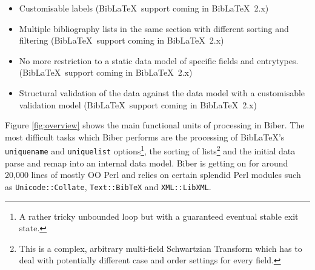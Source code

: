 \documentclass{ltxdockit}
\begin{document}
\begin{itemize}
  etc. (Bib\LaTeX\ support coming in Bib\LaTeX\ 2.x)
\item Customisable labels (Bib\LaTeX\ support coming in
  Bib\LaTeX\ 2.x)
\item Multiple bibliography lists in the same section with different
  sorting and filtering (Bib\LaTeX\ support coming in Bib\LaTeX\ 2.x)
\item No more restriction to a static data model of specific fields and
  entrytypes. (Bib\LaTeX\ support coming in Bib\LaTeX\ 2.x)
\item Structural validation of the data against the data model with a
  customisable validation model (Bib\LaTeX\ support coming in
  Bib\LaTeX\ 2.x)
\end{itemize}

\noindent Figure \ref{fig:overview} shows the main functional units of
processing in Biber. The most difficult tasks which Biber
performs are the processing of Bib\LaTeX's \verb+uniquename+ and
\verb+uniquelist+ options\footnote{A rather tricky unbounded loop but with
  a guaranteed eventual stable exit state.}, the sorting of
lists\footnote{This is a complex, arbitrary multi-field Schwartzian
  Transform which has to deal with potentially different case and order
  settings for every field.} and the initial data parse and remap into an
internal data model. Biber is getting on for around 20,000 lines of
mostly OO Perl and relies on certain splendid Perl modules
such as \verb+Unicode::Collate+, \verb+Text::BibTeX+ and
\verb+XML::LibXML+.
\end{document}
